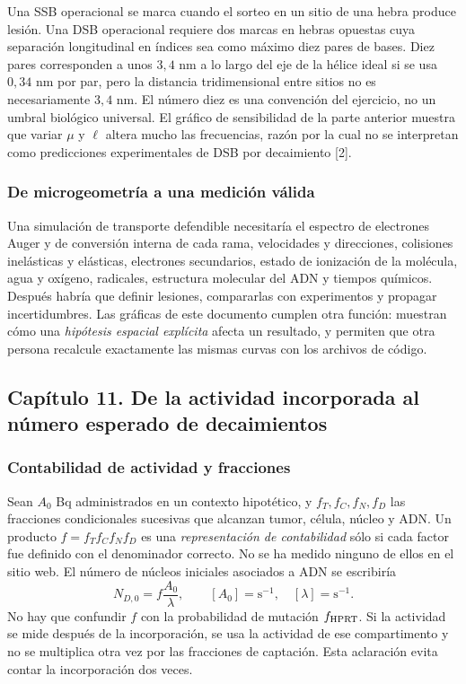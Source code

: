 Una SSB operacional se marca cuando el sorteo en un sitio de una hebra
produce lesión. Una DSB operacional requiere dos marcas en hebras opuestas
cuya separación longitudinal en índices sea como máximo diez pares de bases.
Diez pares corresponden a unos $3,4$ nm a lo largo del eje de la hélice
ideal si se usa $0,34$ nm por par, pero la distancia tridimensional entre
sitios no es necesariamente $3,4$ nm. El número diez es una convención
del ejercicio, no un umbral biológico universal. El gráfico de sensibilidad
de la parte anterior muestra que variar $\mu$ y $\ell$ altera mucho las
frecuencias, razón por la cual no se interpretan como predicciones
experimentales de DSB por decaimiento [2].

\subsubsection{De microgeometría a una medición válida}
Una simulación de transporte defendible necesitaría el espectro de electrones
Auger y de conversión interna de cada rama, velocidades y direcciones,
colisiones inelásticas y elásticas, electrones secundarios, estado de
ionización de la molécula, agua y oxígeno, radicales, estructura molecular
del ADN y tiempos químicos. Después habría que definir lesiones,
compararlas con experimentos y propagar incertidumbres. Las gráficas de
este documento cumplen otra función: muestran cómo una \emph{hipótesis
espacial explícita} afecta un resultado, y permiten que otra persona
recalcule exactamente las mismas curvas con los archivos de código.

\clearpage
\subsection{Capítulo 11. De la actividad incorporada al número esperado de decaimientos}
\label{ampliacion-compartimentos}

\subsubsection{Contabilidad de actividad y fracciones}
Sean $A_0$ Bq administrados en un contexto hipotético, y $f_T,f_C,f_N,f_D$
las fracciones condicionales sucesivas que alcanzan tumor, célula, núcleo
y ADN. Un producto $f=f_Tf_Cf_Nf_D$ es una \emph{representación de
contabilidad} sólo si cada factor fue definido con el denominador correcto.
No se ha medido ninguno de ellos en el sitio web. El número de núcleos
iniciales asociados a ADN se escribiría
\[
N_{D,0}=f\frac{A_0}{\lambda},
\qquad [A_0]=\mathrm{s^{-1}},\quad[\lambda]=\mathrm{s^{-1}}.
\]
No hay que confundir $f$ con la probabilidad de mutación $f_{\rm HPRT}$.
Si la actividad se mide después de la incorporación, se usa la actividad
de ese compartimento y no se multiplica otra vez por las fracciones de
captación. Esta aclaración evita contar la incorporación dos veces.

